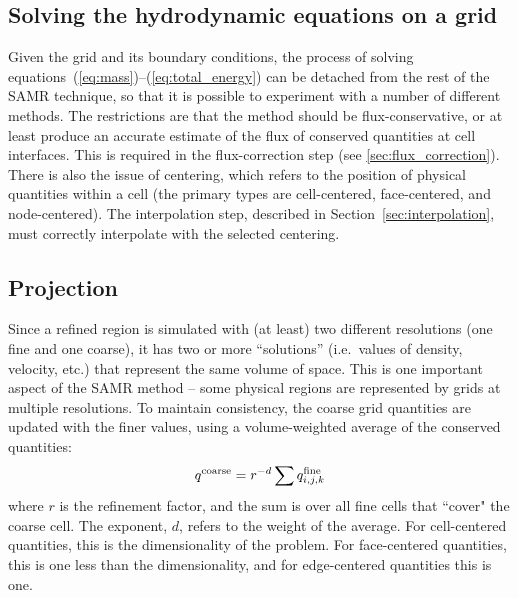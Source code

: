 
\subsection{Solving the hydrodynamic equations on a grid}
\label{sec:solve_hydro}

Given the grid and its boundary conditions, the process of solving
equations~(\ref{eq:mass})--(\ref{eq:total_energy}) can be detached
from the rest of the SAMR technique, so that it is possible to
experiment with a number of different methods.  The restrictions are
that the method should be flux-conservative, or at least produce an
accurate estimate of the flux of conserved quantities at cell
interfaces.  This is required in the flux-correction step (see
\ref{sec:flux_correction}).  There is also the issue of centering,
which refers to the position of physical quantities within a cell (the
primary types are cell-centered, face-centered, and node-centered). 
The interpolation step, described in
Section~\ref{sec:interpolation}, must correctly interpolate with the
selected centering.

\subsection{Projection}
\label{sec:projection}

Since a refined region is simulated with (at least) two different resolutions (one fine and one coarse), it has two or
more ``solutions'' (i.e.~values of density, velocity, etc.) that represent the same volume of space.  This is one important aspect of the SAMR method -- some physical regions are represented by grids at multiple resolutions.  To
maintain consistency, the coarse grid quantities are updated with the finer values, using a volume-weighted average of the conserved quantities:
\begin{equation}
q^{\rm coarse} = r^{-d} \sum q^{\rm fine}_{i, j,k}
\end{equation}
where $r$ is the refinement factor, and the sum is over all fine cells that ``cover" the coarse cell. The exponent, $d$, refers to the weight of the average.  For cell-centered quantities, this is the dimensionality of the problem.  For face-centered quantities, this is one less than the dimensionality, and for edge-centered quantities this is one.


